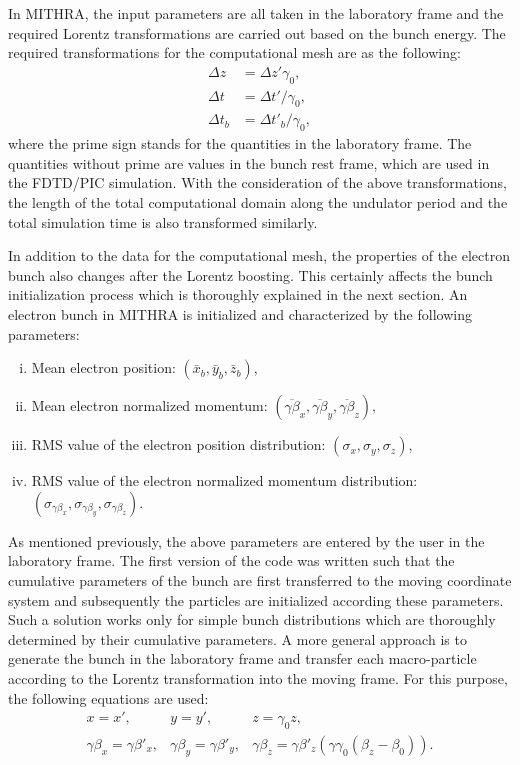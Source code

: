 In MITHRA, the input parameters are all taken in the laboratory frame and the required Lorentz transformations are carried out based on the bunch energy.
%
The required transformations for the computational mesh are as the following:
%
\begin{align}
\Delta z & = \Delta z' \gamma_0,  \label{LorentzTransformB}\\
\Delta t & = \Delta t' / \gamma_0,  \\
\Delta t_b & = \Delta t'_b / \gamma_0,
\end{align}
%
where the prime sign stands for the quantities in the laboratory frame.
%
The quantities without prime are values in the bunch rest frame, which are used in the FDTD/PIC simulation.
%
With the consideration of the above transformations, the length of the total computational domain along the undulator period and the total simulation time is also transformed similarly.

In addition to the data for the computational mesh, the properties of the electron bunch also changes after the Lorentz boosting.
%
This certainly affects the bunch initialization process which is thoroughly explained in the next section.
%
An electron bunch in MITHRA is initialized and characterized by the following parameters:
%
\begin{enumerate}[(i)]
\item Mean electron position: $(\bar{x}_b, \bar{y}_b, \bar{z}_b)$,
\item Mean electron normalized momentum: $(\overline{\gamma \beta}_x, \overline{\gamma \beta}_y, \overline{\gamma \beta}_z)$,
\item RMS value of the electron position distribution: $(\sigma_x, \sigma_y, \sigma_z)$,
\item RMS value of the electron normalized momentum distribution: $(\sigma_{\gamma \beta_x}, \sigma_{\gamma \beta_y}, \sigma_{\gamma \beta_z})$.
\end{enumerate}
%
As mentioned previously, the above parameters are entered by the user in the laboratory frame.
%
The first version of the code was written such that the cumulative parameters of the bunch are first transferred to the moving coordinate system and subsequently the particles are initialized according these parameters.
%
Such a solution works only for simple bunch distributions which are thoroughly determined by their cumulative parameters.
%
A more general approach is to generate the bunch in the laboratory frame and transfer each macro-particle according to the Lorentz transformation into the moving frame.
%
For this purpose, the following equations are used:
%
\begin{equation}
\begin{array}{lll}
x = x', & y = y', & z = \gamma_0 z, \\
\gamma \beta_x = \gamma \beta'_x, &
\gamma \beta_y = \gamma \beta'_y, &
\gamma \beta_z = \gamma \beta'_z \left( \gamma \gamma_0 (\beta_z - \beta_0) \right).
\end{array}
\label{LorentzTrasnformParticles}
\end{equation}


